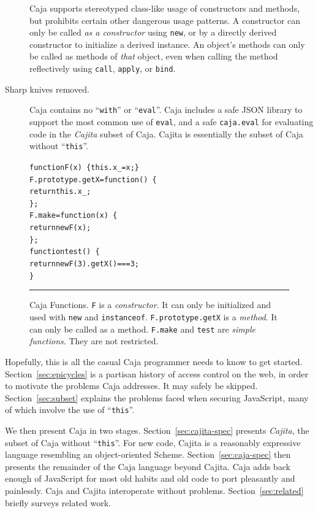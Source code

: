 \documentclass[letterpaper,twocolumn,10pt]{article}
\newcommand{\code}[1]{{\tt {#1}}}              %
\begin{document}
\begin{description}
  Caja supports stereotyped class-like usage of constructors and methods, but 
  prohibits certain other dangerous usage patterns. A constructor can only be 
  called \emph{as a constructor} using \code{new}, or by a directly derived 
  constructor to initialize a derived instance. An object's methods can only 
  be called as methods of \emph{that} object, even when calling the method 
  reflectively using \code{call}, \code{apply}, or \code{bind}.
 
  \item[Sharp knives removed.] Caja contains no ``\code{with}'' or 
  ``\code{eval}''. Caja includes a safe JSON library to support the most 
  common use of \code{eval}, and a safe \code{caja.eval} for evaluating code 
  in the \emph{Cajita} subset of Caja. Cajita is essentially the subset of 
  Caja without ``\code{this}''.
 
\end{description}

\begin{figure}[t!]
\begin{alltt}
function F(x)\ \{ this.x_ = x; \}
F.prototype.getX = function()\ \{
  return this.x_;
\};
F.make = function(x)\ \{
  return new F(x);
\};
function test()\ \{
  return new F(3).getX() === 3;
\}
\end{alltt}

\caption[Caja Functions]{Caja Functions. \code{F} is a \emph{constructor}. It 
can only be initialized and used with \code{new} and \code{instanceof}. 
\code{F.prototype.getX} is a \emph{method}. It can only be called as a 
method. \code{F.make} and \code{test} are \emph{simple functions}. They are
not restricted. \\ } \hrule
\label{fig:func-obj}
\end{figure}

Hopefully, this is all the casual Caja programmer needs to know to get 
started. Section~\ref{sec:epicycles} is a partisan history of access control 
on the web, in order to motivate the problems Caja addresses. It may safely 
be skipped. Section~\ref{sec:subset} explains the problems faced when 
securing JavaScript, many of which involve the use of ``\code{this}''.

We then present Caja in two stages. Section~\ref{sec:cajita-spec} presents 
\emph{Cajita}, the subset of Caja without ``\code{this}''. For new code, 
Cajita is a reasonably expressive language resembling an object-oriented 
Scheme. Section~\ref{sec:caja-spec} then presents the remainder of the Caja 
language beyond Cajita. Caja adds back enough of JavaScript for most old 
habits and old code to port pleasantly and painlessly. Caja and Cajita 
interoperate without problems. Section~\ref{sec:related} briefly 
surveys related work.
\end{document}
